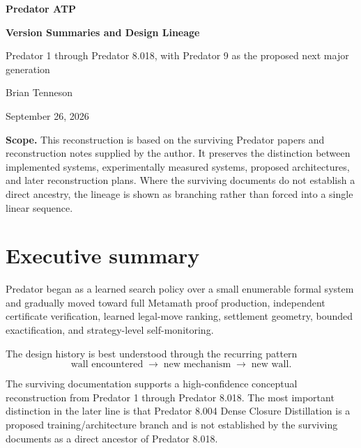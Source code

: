 \documentclass[11pt]{article}
\begin{document}
\begin{titlepage}
\thispagestyle{empty}
\vspace*{0.75in}
{\Huge\bfseries\color{predblue} Predator ATP\par}
\vspace{0.12in}
{\LARGE\bfseries Version Summaries and Design Lineage\par}
\vspace{0.20in}
{\large Predator 1 through Predator 8.018, with Predator 9 as the proposed next major generation\par}
\vspace{0.55in}
{\large Brian Tenneson\par}
{\normalsize September 26, 2026\par}
\vfill
\begin{statusbox}
\textbf{Scope.} This reconstruction is based on the surviving Predator papers and reconstruction notes supplied by the author. It preserves the distinction between implemented systems, experimentally measured systems, proposed architectures, and later reconstruction plans. Where the surviving documents do not establish a direct ancestry, the lineage is shown as branching rather than forced into a single linear sequence.
\end{statusbox}
\vfill
\end{titlepage}

\tableofcontents
\newpage

\section{Executive summary}

Predator began as a learned search policy over a small enumerable formal system and gradually moved toward full Metamath proof production, independent certificate verification, learned legal-move ranking, settlement geometry, bounded exactification, and strategy-level self-monitoring.

The design history is best understood through the recurring pattern
\[
\boxed{\text{wall encountered}}
\;\longrightarrow\;
\boxed{\text{new mechanism}}
\;\longrightarrow\;
\boxed{\text{new wall}}.
\]

The surviving documentation supports a high-confidence conceptual reconstruction from Predator 1 through Predator 8.018. The most important distinction in the later line is that Predator 8.004 Dense Closure Distillation is a proposed training/architecture branch and is not established by the surviving documents as a direct ancestor of Predator 8.018.
\end{document}
